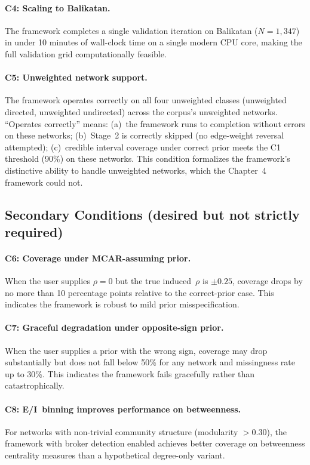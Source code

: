 \documentclass[11pt]{article}
\begin{document}
\paragraph{C4: Scaling to Balikatan.} The framework completes a single validation iteration on Balikatan ($N = 1{,}347$) in under 10 minutes of wall-clock time on a single modern CPU core, making the full validation grid computationally feasible.

\paragraph{C5: Unweighted network support.} The framework operates correctly on all four unweighted classes (unweighted directed, unweighted undirected) across the corpus's unweighted networks. ``Operates correctly'' means: (a)~the framework runs to completion without errors on these networks; (b)~Stage~2 is correctly skipped (no edge-weight reversal attempted); (c)~credible interval coverage under correct prior meets the C1 threshold (90\%) on these networks. This condition formalizes the framework's distinctive ability to handle unweighted networks, which the Chapter~4 framework could not.

\subsection{Secondary Conditions (desired but not strictly required)}

\paragraph{C6: Coverage under MCAR-assuming prior.} When the user supplies $\rho = 0$ but the true induced~$\rho$ is $\pm 0.25$, coverage drops by no more than 10 percentage points relative to the correct-prior case. This indicates the framework is robust to mild prior misspecification.

\paragraph{C7: Graceful degradation under opposite-sign prior.} When the user supplies a prior with the wrong sign, coverage may drop substantially but does not fall below 50\% for any network and missingness rate up to 30\%. This indicates the framework fails gracefully rather than catastrophically.

\paragraph{C8: E/I~binning improves performance on betweenness.} For networks with non-trivial community structure (modularity $> 0.30$), the framework with broker detection enabled achieves better coverage on betweenness centrality measures than a hypothetical degree-only variant.
\end{document}
